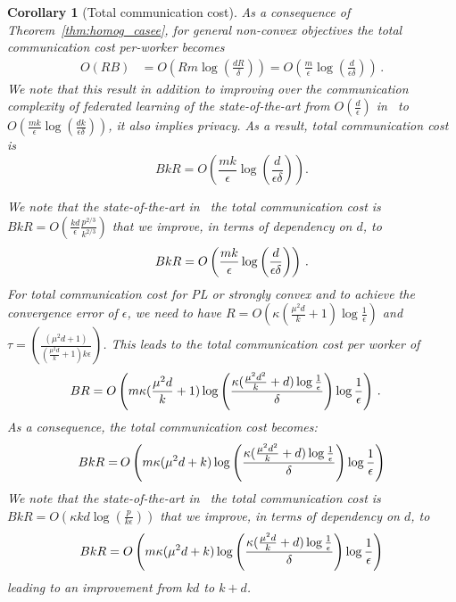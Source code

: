 \documentclass[twoside]{article}
\newtheorem{corollary}{Corollary}
\begin{document}
\begin{corollary}[Total communication cost]
As a consequence of Theorem~\ref{thm:homog_casee}, for general non-convex objectives the total communication cost per-worker becomes \begin{align}
O\left(RB\right)&=O\left(Rm\log \left(\frac{d R}{\delta}\right)\right)=O\left(\frac{m }{\epsilon}\log \left(\frac{d }{\epsilon\delta}\right)\right) \, .
\end{align}
We note that this result in addition to improving over the communication complexity of federated learning of the state-of-the-art from $O\left(\frac{d}{\epsilon}\right)$ in~\cite{karimireddy2019scaffold,wang2018cooperative,liang2019variance} to $O\left(\frac{m k}{\epsilon}\log \left(\frac{d k}{\epsilon\delta}\right)\right)$, it also implies privacy. As a result, total communication cost is 
$$BkR=O\left(\frac{m k}{\epsilon}\log \left(\frac{d }{\epsilon\delta}\right)\right).$$ 

We note that the state-of-the-art in~\cite{karimireddy2019scaffold} the total communication cost is $BkR=O\left(\frac{kd}{\epsilon}\frac{p^{2/3}}{k^{2/3}}\right)$ that we improve, in terms of dependency on $d$, to 
\begin{align}\notag
    BkR=O\left(\frac{m k}{\epsilon}\log \left(\frac{d }{\epsilon\delta}\right)\right) \, .
\end{align}
For total communication cost for PL or strongly convex and to achieve the convergence error of $\epsilon$, we need to have $R=O\left(\kappa(\frac{\mu^2d}{k}+1)\log\frac{1}{\epsilon}\right)$ and $\tau=\left(\frac{(\mu^2d+1)}{(\frac{\mu^2d}{k}+1)k\epsilon}\right)$. This leads to the total communication cost per worker of 
\begin{align}\notag
BR&=O\left(m\kappa(\frac{\mu^2d}{k}+1)\log\left(\frac{\kappa(\frac{\mu^2d^2}{k}+d)\log\frac{1}{\epsilon}}{\delta}\right)\log\frac{1}{\epsilon} \right) \, .
\end{align}
As a consequence, the total communication cost becomes:
{\small \begin{align}\notag
BkR= \hspace{-0.01in} O\left(m\kappa(\mu^2d+k)\log\left(\frac{\kappa(\frac{\mu^2d^2}{k}+d)\log\frac{1}{\epsilon}}{\delta}\right)\log\frac{1}{\epsilon} \right) 
\end{align}}
We note that the state-of-the-art in~\cite{karimireddy2019scaffold} the total communication cost is $BkR=O\left(\kappa kd\log\left(\frac{p}{k\epsilon}\right)\right)$ that we improve, in terms of dependency on $d$, to 
{\small \begin{align}\notag
    BkR=O\left(m\kappa(\mu^2d+k)\log\left(\frac{\kappa(\frac{\mu^2d}{k}+d)\log\frac{1}{\epsilon}}{\delta}\right)\log\frac{1}{\epsilon} \right)
\end{align}}
leading to an improvement from $kd$ to $k+d$. 
\end{corollary}
\end{document}
